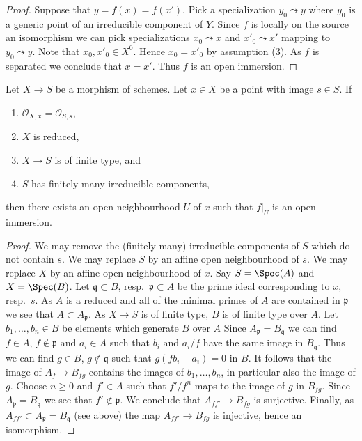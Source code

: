 \begin{proof}
Suppose that $y = f(x) = f(x')$. Pick a specialization $y_0 \leadsto y$
where $y_0$ is a generic point of an irreducible component of $Y$.
Since $f$ is locally on the source an isomorphism we can pick specializations
$x_0 \leadsto x$ and $x'_0 \leadsto x'$ mapping to $y_0 \leadsto y$.
Note that $x_0, x'_0 \in X^0$. Hence $x_0 = x'_0$ by assumption (3).
As $f$ is separated we conclude that $x = x'$. Thus $f$ is an open immersion.
\end{proof}

\begin{lemma}
\label{lemma-local-isomorphism}
Let $X \to S$ be a morphism of schemes. Let $x \in X$ be a point with
image $s \in S$. If
\begin{enumerate}
\item $\mathcal{O}_{X, x} = \mathcal{O}_{S, s}$,
\item $X$ is reduced,
\item $X \to S$ is of finite type, and
\item $S$ has finitely many irreducible components,
\end{enumerate}
then there exists an open neighbourhood $U$
of $x$ such that $f|_U$ is an open immersion.
\end{lemma}

\begin{proof}
We may remove the (finitely many) irreducible components of $S$
which do not contain $s$. We may replace $S$ by an affine open
neighbourhood of $s$. We may replace $X$ by an affine open neighbourhood
of $x$. Say $S = \Spec(A)$ and $X = \Spec(B)$. Let $\mathfrak q \subset B$,
resp.\ $\mathfrak p \subset A$ be the prime ideal corresponding to $x$,
resp.\ $s$. As $A$ is a reduced and all of the minimal primes of
$A$ are contained in $\mathfrak p$ we see that $A \subset A_\mathfrak p$.
As $X \to S$ is of finite type, $B$ is of finite type over $A$.
Let $b_1, \ldots, b_n \in B$ be elements which generate $B$ over $A$
Since $A_\mathfrak p = B_\mathfrak q$ we can find
$f \in A$, $f \not \in \mathfrak p$
and $a_i \in A$ such that $b_i$ and $a_i/f$ have the same image
in $B_\mathfrak q$. Thus we can find $g \in B$, $g \not \in \mathfrak q$
such that $g(fb_i - a_i) = 0$ in $B$. It follows that the image of
$A_f \to B_{fg}$ contains the images of $b_1, \ldots, b_n$, in
particular also the image of $g$.
Choose $n \geq 0$ and $f' \in A$ such that $f'/f^n$ maps
to the image of $g$ in $B_{fg}$. Since $A_\mathfrak p = B_\mathfrak q$
we see that $f' \not \in \mathfrak p$.
We conclude that $A_{ff'} \to B_{fg}$ is surjective.
Finally, as $A_{ff'} \subset A_\mathfrak p = B_\mathfrak q$ (see above)
the map $A_{ff'} \to B_{fg}$ is injective, hence an isomorphism.
\end{proof}

